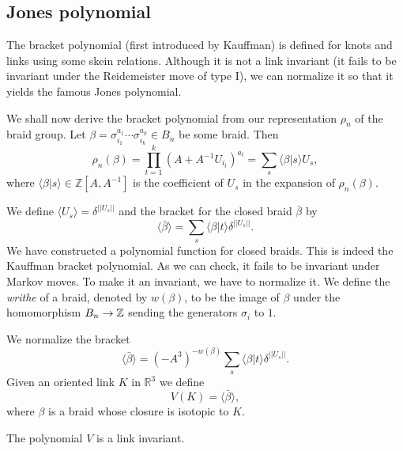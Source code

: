 \subsection{Jones polynomial}

The bracket polynomial (first introduced by Kauffman) is defined for knots and links using some skein relations. Although it is not a link invariant (it fails to be invariant under the Reidemeister move of type I), we can normalize it so that it yields the famous Jones polynomial.

We shall now derive the bracket polynomial from our representation $\rho_n$ of the braid group. Let $\beta = \sigma^{a_1}_{i_1}\cdots \sigma^{a_k}_{i_k} \in B_n$ be some braid. Then
\begin{displaymath}
\rho_n(\beta) = \prod^k_{t=1} (A+A^{-1}U_{i_t})^{a_t} = \sum_s \langle \beta | s \rangle U_s,
\end{displaymath}
where $\langle \beta | s \rangle \in \mathbb{Z}[A, A^{-1}]$ is the coefficient of $U_s$ in the expansion of $\rho_n(\beta)$.

We define $\langle U_s \rangle = \delta^{||U_s||}$ and the bracket for the closed braid $\bar{\beta}$ by 
\begin{displaymath}
\langle \bar{\beta} \rangle = \sum_s \langle \beta | t \rangle \delta^{||U_s||}.
\end{displaymath}
We have constructed a polynomial function for closed braids. This is indeed the Kauffman bracket polynomial. As we can check, it fails to be invariant under Markov moves. To make it an invariant, we have to normalize it. We define the \emph{writhe} of a braid, denoted by $w(\beta)$, to be the image of $\beta$ under the homomorphism $B_n \to \mathbb{Z}$ sending the generators $\sigma_i$ to $1$.

We normalize the bracket 
\begin{displaymath}
  \langle \bar{\beta} \rangle = (-A^3)^{-w(\beta)} \sum_s \langle \beta | t \rangle \delta^{||U_s||}.
\end{displaymath}
  Given an oriented link $K$ in $\mathbb{R}^3$ we define 
\begin{displaymath}
V(K) = \langle \bar{\beta} \rangle,
\end{displaymath}
where $\beta$ is a braid whose closure is isotopic to $K$.

\begin{theorem}
The polynomial $V$ is a link invariant.
\end{theorem}
  
